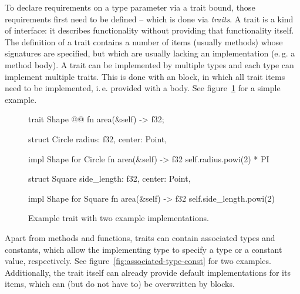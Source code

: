 To declare requirements on a type parameter via a trait bound, those requirements first need to be defined -- which is done via \emph{traits}.
A trait is a kind of interface: it describes functionality without providing that functionality itself.
The definition of a trait contains a number of items (usually methods) whose signatures are specified, but which are usually lacking an implementation (e.\,g. a method body).
A trait can be implemented by multiple types and each type can implement multiple traits.
This is done with an  block, in which all trait items need to be implemented, i.\,e. provided with a body.
See figure~\ref{fig:shapes} for a simple example.

\newpage

\begin{figure}[t]
  \centering
  \begin{minipage}{.65\textwidth}
    \begin{rustcode}
    trait Shape {@@
        fn area(&self) -> f32;
    }
    \end{rustcode}
    \end{minipage}

    \vspace{3mm}

    \begin{minipage}[t]{.49\textwidth}
    \begin{rustcode}
    struct Circle {
        radius: f32,
        center: Point,
    }

    impl Shape for Circle {
        fn area(&self) -> f32 {
            self.radius.powi(2) * PI
        }
    }
    \end{rustcode}
  \end{minipage}
  \begin{minipage}[t]{.49\textwidth}
    \begin{rustcode}
    struct Square {
        side_length: f32,
        center: Point,
    }

    impl Shape for Square {
        fn area(&self) -> f32 {
            self.side_length.powi(2)
        }
    }
    \end{rustcode}
  \end{minipage}
  \caption{Example trait with two example implementations.}
  \label{fig:shapes}
  \vspace{5mm}
\end{figure}

Apart from methods and functions, traits can contain associated types and constants, which allow the implementing type to specify a type or a constant value, respectively.
See figure~\ref{fig:associated-type-const} for two examples.
Additionally, the trait itself can already provide default implementations for its items, which can (but do not have to) be overwritten by  blocks.


